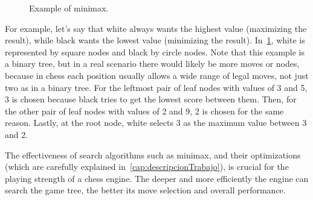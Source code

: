 \begin{figure}[H]
    \centering
    \caption{Example of minimax.}\label{fig:minimax}
\end{figure}

\noindent For example, let's say that white always wants the highest value (maximizing the result), while black wants the lowest value (minimizing the result). In~\cref{fig:minimax}, white is represented by square nodes and black by circle nodes. Note that this example is a binary tree, but in a real scenario there would likely be more moves or nodes, because in chess each position usually allows a wide range of legal moves, not just two as in a binary tree. For the leftmost pair of leaf nodes with values of 3 and 5, 3 is chosen because black tries to get the lowest score between them. Then, for the other pair of leaf nodes with values of 2 and 9, 2 is chosen for the same reason. Lastly, at the root node, white selects 3 as the maximum value between 3 and 2.

\vspace{1em}

\noindent The effectiveness of search algorithms such as minimax, and their optimizations (which are carefully explained in~\cref{cap:descripcionTrabajo}), is crucial for the playing strength of a chess engine. The deeper and more efficiently the engine can search the game tree, the better its move selection and overall performance.

